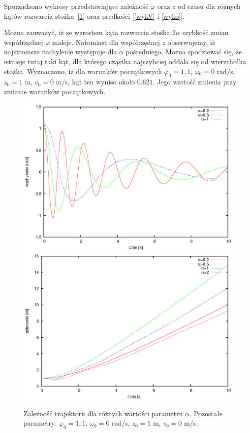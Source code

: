 \documentclass[11pt]{article}
\begin{document}
Sporządzono wykresy przedstawiające zależność $\varphi$ oraz $z$ od czasu dla różnych kątów rozwarcia 
stożka~[\ref{wyk23}] oraz prędkości [\ref{wykV} i \ref{wyko}]. 

Można zauważyć, iż ze wzrostem kąta rozwarcia stośka $2\alpha$ szybkość zmian współrzędnej $\varphi$ maleje.
Natomiast dla współrzędnej $z$ obserwujemy, iż najstromsze nachylenie występuje dla $\alpha$ pośredniego. 
Można spodziewać się, że istnieje tutaj taki kąt, dla którego cząstka najszybciej oddala się od wierzchołka 
stożka. Wyznaczono, iż dla warunków początkowych $\varphi_0=1,1$, $\omega_0=0 $ rad/s, $z_0=1$ m, $v_0=0 $ m/s, kąt 
ten wyniso około $0.621$. Jego wartość zmienia przy zmianie warunków początkowych.

\begin{figure}[h!]
\begin{center}
\includegraphics[]{oda.eps}
\includegraphics[]{odam.eps}
\caption{Zależność trajektorii dla różnych wartości parametru $\alpha$.
	Pozostałe parametry: $\varphi_0=1,1$, $\omega_0=0 $ rad/s, $z_0=1$ m, $v_0=0 $ m/s.}{\label{wyk23}}
\end{center}
\end{figure}
\end{document}
